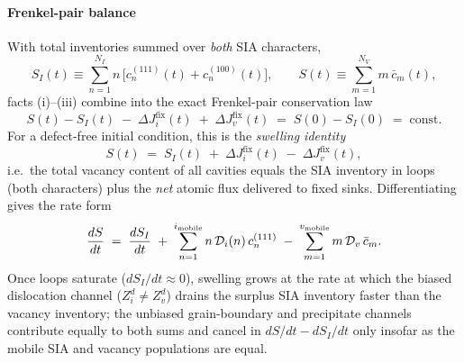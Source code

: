 \paragraph{Frenkel-pair balance}
\label{sec:FP_balance}
With total inventories summed over \emph{both} SIA characters,
\begin{equation}\label{eq:SI_S}
    S_I(t) \equiv \sum_{n=1}^{N_I} n\,\bigl[c^{(111)}_n(t)+c^{(100)}_n(t)\bigr],
    \qquad
    S(t)   \equiv \sum_{m=1}^{N_V} m\,\bar{c}_m(t),
\end{equation}
facts (i)--(iii) combine into the exact Frenkel-pair conservation law
\begin{equation}\label{eq:mass_FP}
  S(t) - S_I(t)
  \;-\; \Delta J_i^{\mathrm{fix}}(t)
  \;+\; \Delta J_v^{\mathrm{fix}}(t)
  \;=\; S(0) - S_I(0)
  \;=\; \mathrm{const.}
\end{equation}
For a defect-free initial condition, this is the \emph{swelling identity}
\begin{equation}\label{eq:swelling_identity}
    S(t) \;=\; S_I(t)
          \;+\; \Delta J_i^{\mathrm{fix}}(t)
          \;-\; \Delta J_v^{\mathrm{fix}}(t),
\end{equation}
i.e.\ the total vacancy content of all cavities equals the SIA inventory in
loops (both characters) plus the \emph{net} atomic flux delivered to fixed
sinks. Differentiating gives the rate form
\begin{equation}\label{eq:dSdt}
    \frac{dS}{dt}
    \;=\; \frac{dS_I}{dt}
    \;+\; \sum_{n=1}^{i_{\rm mobile}} n\,\mathcal{D}_i(n)\,c^{(111)}_n
    \;-\; \sum_{m=1}^{v_{\rm mobile}} m\,\mathcal{D}_v\,\bar{c}_m.
\end{equation}
Once loops saturate ($dS_I/dt \approx 0$), swelling grows at the rate at which
the biased dislocation channel ($Z_i^d \neq Z_v^d$) drains the surplus SIA
inventory faster than the vacancy inventory; the unbiased grain-boundary and
precipitate channels contribute equally to both sums and cancel in
$dS/dt - dS_I/dt$ only insofar as the mobile SIA and vacancy populations are
equal.

